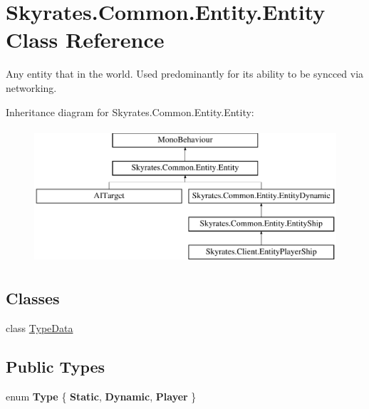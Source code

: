 \hypertarget{class_skyrates_1_1_common_1_1_entity_1_1_entity}{\section{Skyrates.\-Common.\-Entity.\-Entity Class Reference}
\label{class_skyrates_1_1_common_1_1_entity_1_1_entity}
}


Any entity that in the world. Used predominantly for its ability to be syncced via networking.  


Inheritance diagram for Skyrates.\-Common.\-Entity.\-Entity\-:\begin{figure}[H]
\begin{center}
\leavevmode
\includegraphics[height=5.000000cm]{class_skyrates_1_1_common_1_1_entity_1_1_entity}
\end{center}
\end{figure}
\subsection*{Classes}
\begin{DoxyCompactItemize}
\item 
class \hyperlink{class_skyrates_1_1_common_1_1_entity_1_1_entity_1_1_type_data}{Type\-Data}
\end{DoxyCompactItemize}
\subsection*{Public Types}
\begin{DoxyCompactItemize}
\item 
enum {\bfseries Type} \{ {\bfseries Static}, 
{\bfseries Dynamic}, 
{\bfseries Player}
 \}
\end{DoxyCompactItemize}
